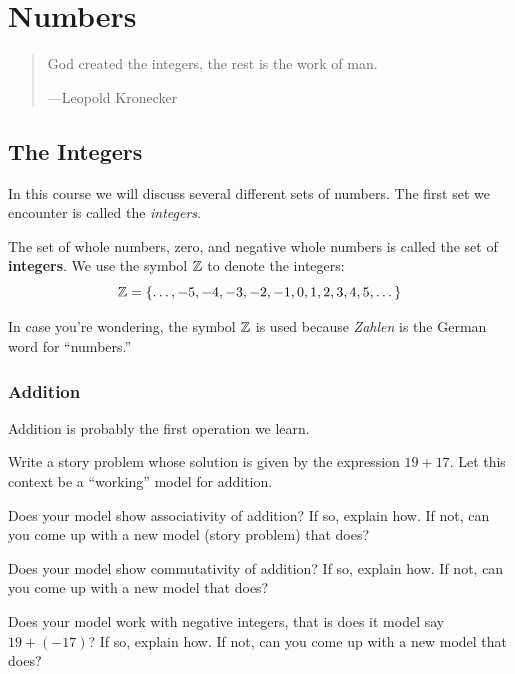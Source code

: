 \chapter{Numbers}

\begin{quote}
God created the integers, the rest is the work of man.

\hfill---Leopold Kronecker 
\end{quote}

\section{The Integers}

In this course we will discuss several different sets of numbers. The
first set we encounter is called the \textit{integers}.

\begin{definition}
The set of whole numbers, zero, and negative whole numbers is called
the set of \textbf{integers}. We use the symbol $\mathbb Z$ to denote the
integers:
\[
\mathbb Z = \{\dots, -5,-4,-3,-2,-1,0,1,2,3,4,5,\dots \}
\]
\end{definition}

In case you're wondering, the symbol $\mathbb Z$ is used because
\textit{Zahlen} is the German word for ``numbers.'' 


\subsection{Addition}

Addition is probably the first operation we learn. 

\begin{question}
Write a story problem whose solution is given by the expression
$19+17$. Let this context be a ``working'' model for addition.
\end{question}
\QM

\begin{question}
Does your model show associativity of addition? If so, explain how. If
not, can you come up with a new model (story problem) that does?
\end{question}
\QM

\begin{question}
Does your model show commutativity of addition? If so, explain how. If
not, can you come up with a new model that does?
\end{question}
\QM


\begin{question}
Does your model work with negative integers, that is does it model say
$19+ (-17)$? If so, explain how. If not, can you come up with a new
model that does?
\end{question}
\QM


